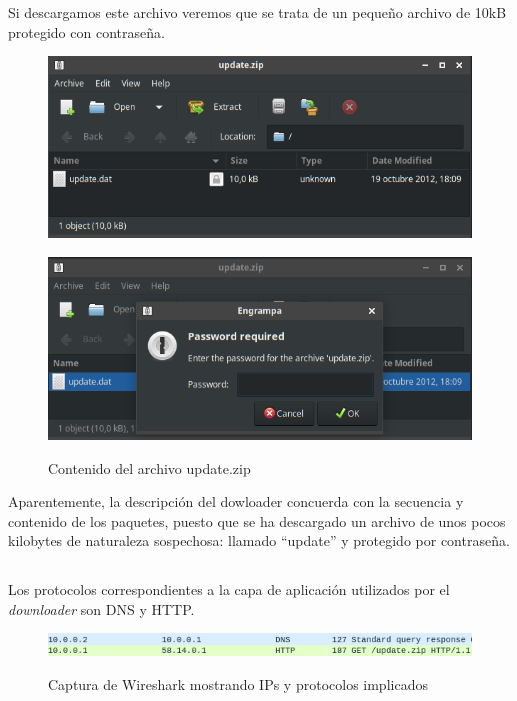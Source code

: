 \documentclass[10pt,a4paper]{article}
\begin{document}
Si descargamos este archivo veremos que se trata de un pequeño archivo de 10kB protegido con contraseña.

\begin{figure}[h!]
  \centering
  \includegraphics[scale=0.6]{1_1_3.png}\\
  \label{fig:update}
\end{figure}

\begin{figure}[h!]
  \centering
  \includegraphics[scale=0.6]{1_1_4.png}\\
    \caption{Contenido del archivo update.zip}
  \label{fig:update2}
\end{figure}

Aparentemente, la descripción del dowloader concuerda con la secuencia y contenido de los paquetes, puesto que se ha descargado un archivo de unos pocos kilobytes de naturaleza sospechosa: llamado ``update'' y protegido por contraseña.

\subsection{}
Los protocolos correspondientes a la capa de aplicación utilizados por el \textit{downloader} son DNS y HTTP.

\begin{figure}[h!]
  \centering
  \includegraphics[scale=0.6]{1_2.png}\\
      \caption{Captura de Wireshark mostrando IPs y protocolos implicados}
  \label{fig:http_dns}
\end{figure}
\end{document}
